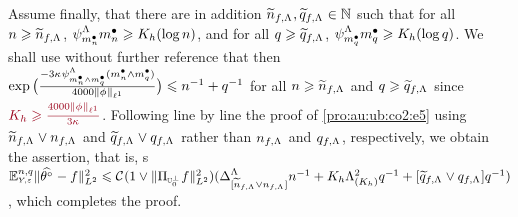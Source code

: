 \begin{pro}
Assume finally, that there are in addition
$\widetilde{\ssY}_{\xdf,\iSv},\widetilde{\ssE}_{\xdf,\iSv}\in\Nz$ such
that for all $\ssY\geq\widetilde{\ssY}_{\xdf,\iSv}$,
$\cmiSv[\sDi{\ssY}]\sDi{\ssY}\geq K_{\ydf}(\log\ssY)$, and for all
$\ssE\geq\widetilde{\ssE}_{\xdf,\iSv}$,
$\cmiSv[\sDi{\ssE}]\sDi{\ssE}\geq K_{\ydf}(\log\ssE)$.
We shall use without further
reference that then $\exp\big(\tfrac{-3\cpen\cmiSv[\sDi{\ssY}\wedge\sDi{\ssE}](\sDi{\ssY}\wedge\sDi{\ssE})}{4000\Vnormlp[1]{\fydf}}\big)\leq\ssY^{-1}+\ssE^{-1}$ for
all $\ssY\geq\widetilde{\ssY}_{\xdf,\iSv}$ and $\ssE\geq\widetilde{\ssE}_{\xdf,\iSv}$
since $\dr K_{\ydf}\geq
\tfrac{4000\Vnormlp[1]{\fydf}}{3\cpen}$. Following line by line the
proof of \eqref{pro:au:ub:co2:e5} using
$\widetilde{\ssY}_{\xdf,\iSv}\vee\ssY_{\xdf,\iSv}$ and
$\widetilde{\ssE}_{\xdf,\iSv}\vee\ssE_{\xdf,\iSv}$ rather than
$\ssY_{\xdf,\iSv}$ and $\ssE_{\xdf,\iSv}$, respectively, we obtain the
assertion, that is,
s $\FuEx[\ssY,\ssE]{\rY,\rE}\VnormLp{\hxdfPr[]-\xdf}^2
\leq\cst{}(1\vee\VnormLp{\Proj[{\mHiH[0]^\perp}]\xdf}^2)(\DipenSv[{[\widetilde{\ssY}_{\xdf,\iSv}\vee\ssY_{\xdf,\iSv}]}]\ssY^{-1}+K_{\ydf}\miSv[K_{\ydf}]^2\ssE^{-1}+[\widetilde{\ssE}_{\xdf,\iSv}\vee\ssE_{\xdf,\iSv}]\ssE^{-1})$, which completes the proof.
\end{pro}

